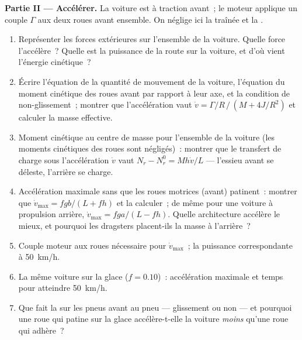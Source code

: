 \begin{problem}
\medskip
\noindent\textbf{Partie II --- Accélérer.}
La voiture est à traction avant~; le moteur applique un couple $\Gamma$ aux
deux roues avant ensemble. On néglige ici la traînée et la .
\begin{enumerate}[resume]
  \item Représenter les forces extérieures sur l'ensemble de la voiture. Quelle force
        l'accélère~? Quelle est la puissance de la route sur la voiture, et
        d'où vient l'énergie cinétique~?
  \item Écrire l'équation de la quantité de mouvement de la voiture, l'équation du moment
        cinétique des roues avant par rapport à leur axe, et la
        condition de non-glissement~; montrer que l'accélération vaut $\dot v =
        \Gamma/R\,/\,(M + 4J/R^2)$ et calculer la masse effective.
  \item Moment cinétique au centre de masse pour l'ensemble de la voiture
        (les moments cinétiques des roues sont négligés)~: montrer que
        le transfert de charge sous l'accélération $\dot v$ vaut $N_r - N_r^0 =
        Mh\dot v/L$ --- l'essieu avant se déleste, l'arrière se charge.
  \item Accélération maximale sans que les roues motrices (avant)
        patinent~: montrer que $\dot v_{\max} = fgb/(L + fh)$ et la
        calculer~; de même pour une voiture à propulsion arrière, $\dot v_{\max} =
        fga/(L - fh)$. Quelle architecture accélère le mieux, et pourquoi les
        dragsters placent-ils la masse à l'arrière~?
  \item Couple moteur aux roues nécessaire pour $\dot v_{\max}$~; la
        puissance correspondante à \qty{50}{km/h}.
  \item La même voiture sur la glace ($f = 0.10$)~: accélération maximale et
        temps pour atteindre \qty{50}{km/h}.
  \item Que fait la  sur les pneus avant au pneu
        --- glissement ou non --- et pourquoi une roue qui patine sur la glace
        accélère-t-elle la voiture \emph{moins} qu'une roue qui adhère~?
\end{enumerate}


\end{problem}
